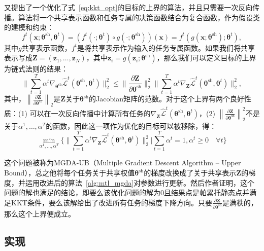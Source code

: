 \documentclass{ctexart}
\begin{document}
\citet{Sener18Pareto}又提出了一个优化了式~\ref{eq:kkt_opt}的目标的上界的算法，并且只需要一次反向传播。算法将一个共享表示函数和任务专属的决策函数结合为复合函数，作为假设类的建模和约束：
\begin{equation}
    f^t(\mathbf{x};\bm\theta^\mathrm{sh},\bm\theta^t) = (f^t(\cdot; \bm\theta^t) \circ g(\cdot; \bm\theta^\mathrm{sh})) (\mathbf{x})  = f^t( g(\mathbf{x}; \bm\theta^\mathrm{sh}); \bm\theta^t),
\end{equation}
其中$g$共享表示函数，$f^t$是将共享表示作为输入的任务专属函数。如果我们将共享表示写成$\mathbf{Z} = \left(\mathbf{z}_1,\ldots , \mathbf{z}_N\right)$，其中$\mathbf{z}_i = g(\mathbf{z}_i;\bm\theta^\mathrm{sh})$，那么我们可以定义目标的上界为链式法则的结果：
\begin{equation}
    \Bigg\| \sum_{t=1}^T \alpha^t \nabla_{\bm\theta^\mathrm{sh}}  \hat{\mathcal{L}}^t(\bm\theta^\mathrm{sh},\bm\theta^t) \Bigg\|_2^2  \leq    \Bigg\|\frac{\partial \mathbf{Z}}{\partial \bm\theta^\mathrm{sh}}\Bigg\|_2^2 \Bigg\| \sum_{t=1}^T \alpha^t  \nabla_{\mathbf{Z}}  \hat{\mathcal{L}}^t(\bm\theta^\mathrm{sh},\bm\theta^t) \Bigg\|_2^2,
\end{equation}
其中，$\left\|\frac{\partial \mathbf{Z}}{\partial \bm\theta^\mathrm{sh}}\right\|_2$是$\mathbf{Z}$关于$\bm\theta^\mathrm{sh}$的Jacobian矩阵的范数。对于这个上界有两个良好性质：(1) 可以在一次反向传播中计算所有任务的$\nabla_{\mathbf{Z}} \hat{\mathcal{L}}^t(\bm\theta^\mathrm{sh},\bm\theta^t)$，(2) $\left\|\frac{\partial \mathbf{Z}}{\partial \bm\theta^\mathrm{sh}}\right\|_2^2 $不是关于$\alpha^1,\ldots ,\alpha^T$的函数，因此这一项作为优化的目标可以被移除，得：
\begin{equation}
\min_{\alpha^1,\ldots,\alpha^T}  \Bigg\{  \bigg\| \sum_{t=1}^T \alpha^t  \nabla_{\mathbf{Z}}  \hat{\mathcal{L}}^t(\bm\theta^\mathrm{sh},\bm\theta^t) \bigg\|_2^2 \bigg |  \sum_{t=1}^T \alpha^t = 1, \alpha^t \geq 0 \quad \forall t \Bigg\}
\label{eq:approx}
\end{equation}

这个问题被称为MGDA-UB（Multiple Gradient Descent Algorithm -- Upper Bound），总之他将每个任务关于共享权值$\bm\theta^\mathrm{sh}$的梯度改换成了关于共享表示$\mathbf{Z}$的梯度，并运用改进后的算法~\ref{alg:mtl_mgda}对参数进行更新。然后作者证明，这个问题的解也满足\citet{Desideri12MGDA}的结论，即要么该优化问题的解为$0$且结果点是帕累托静态点并满足KKT条件，要么该解给出了改进所有任务的梯度下降方向。只要$\frac{\partial\mathbf{Z}}{\partial\bm\theta^\mathrm{sh}}$是满秩的，那么这个上界便成立。

\subsection{实现}
\end{document}
